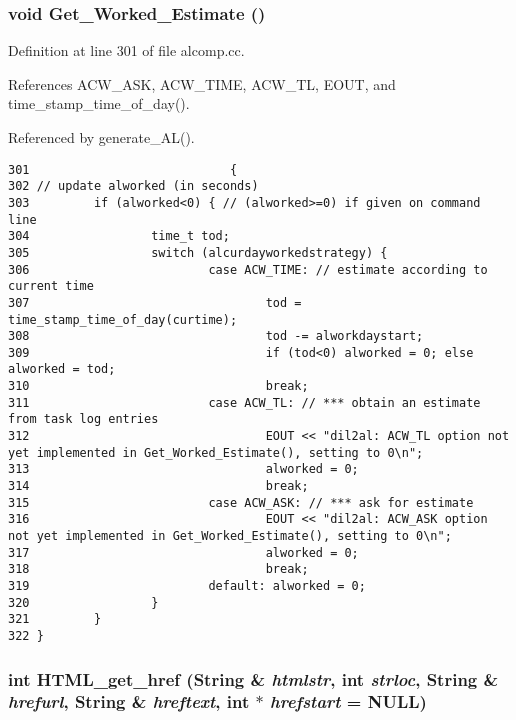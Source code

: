 \subsubsection{\setlength{\rightskip}{0pt plus 5cm}void Get\_\-Worked\_\-Estimate ()}\label{dil2al_8hh_a290}




Definition at line 301 of file alcomp.cc.

References ACW\_\-ASK, ACW\_\-TIME, ACW\_\-TL, EOUT, and time\_\-stamp\_\-time\_\-of\_\-day().

Referenced by generate\_\-AL().



\footnotesize\begin{verbatim}301                            {
302 // update alworked (in seconds)
303         if (alworked<0) { // (alworked>=0) if given on command line
304                 time_t tod;
305                 switch (alcurdayworkedstrategy) {
306                         case ACW_TIME: // estimate according to current time
307                                 tod = time_stamp_time_of_day(curtime);
308                                 tod -= alworkdaystart;
309                                 if (tod<0) alworked = 0; else alworked = tod;
310                                 break;
311                         case ACW_TL: // *** obtain an estimate from task log entries
312                                 EOUT << "dil2al: ACW_TL option not yet implemented in Get_Worked_Estimate(), setting to 0\n";
313                                 alworked = 0;
314                                 break;
315                         case ACW_ASK: // *** ask for estimate
316                                 EOUT << "dil2al: ACW_ASK option not yet implemented in Get_Worked_Estimate(), setting to 0\n";
317                                 alworked = 0;
318                                 break;
319                         default: alworked = 0;
320                 }
321         }
322 }
\end{verbatim}\normalsize 
{}
\subsubsection{\setlength{\rightskip}{0pt plus 5cm}int HTML\_\-get\_\-href ({\bf String} \& {\em htmlstr}, int {\em strloc}, {\bf String} \& {\em hrefurl}, {\bf String} \& {\em hreftext}, int $\ast$ {\em hrefstart} = NULL)}\label{dil2al_8hh_a257}




